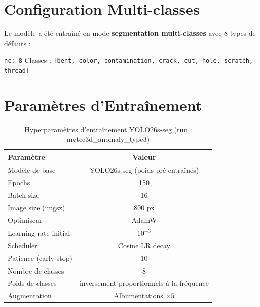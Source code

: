 \documentclass[12pt, a4paper]{report}
\begin{document}
\section{Configuration Multi-classes}

Le modèle a été entraîné en mode \textbf{segmentation multi-classes} avec 8 types de défauts :

\begin{infobox}
\texttt{nc: 8} \quad Classes : \texttt{[bent, color, contamination, crack, cut, hole, scratch, thread]}
\end{infobox}

\section{Paramètres d'Entraînement}

\begin{table}[H]
  \centering
  \caption{Hyperparamètres d'entraînement YOLO26s-seg (run : mvtec3d\_anomaly\_type3)}
  \label{tab:hyperparams}
  \begin{tabular}{lc}
    \toprule
    \rowcolor{themebluevlight}
    \textbf{Paramètre} & \textbf{Valeur} \\
    \midrule
    Modèle de base        & YOLO26s-seg (poids pré-entraînés) \\
    Epochs                & 150 \\
    Batch size            & 16 \\
    Image size (imgsz)    & 800 px \\
    Optimiseur            & AdamW \\
    Learning rate initial & $10^{-3}$ \\
    Scheduler             & Cosine LR decay \\
    Patience (early stop) & 10 \\
    Nombre de classes     & 8 \\
    Poids de classes      & inversement proportionnels à la fréquence \\
    Augmentation          & Albumentations $\times 5$ \\
    \bottomrule
  \end{tabular}
\end{table}

\newpage

\end{document}
